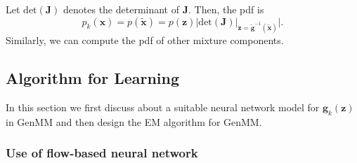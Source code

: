 Let $\mathrm{det}(\bm{J})$ denotes the determinant of $\bm{J}$. Then, the pdf is
\begin{equation}\label{eq:sufficient-change-var}
  p_k(\bm{x}) = p(\tilde{\bm{x}}) =  p(\bm{z}) \bigg| \mathrm{det}(\bm{J}) \big|_{\bm{z}=\tilde{\bm{g}}^{-1}(\tilde{\bm{x}})}\bigg|.
\end{equation}
Similarly, we can compute the pdf of other mixture components.

\subsection{Algorithm for Learning}
In this section we first discuss about a suitable neural network model for $\bm{g}_k(\bm{z})$ in GenMM and then design the EM algorithm for GenMM. 

\subsubsection{Use of flow-based neural network}\label{subsec-flow-intro}


